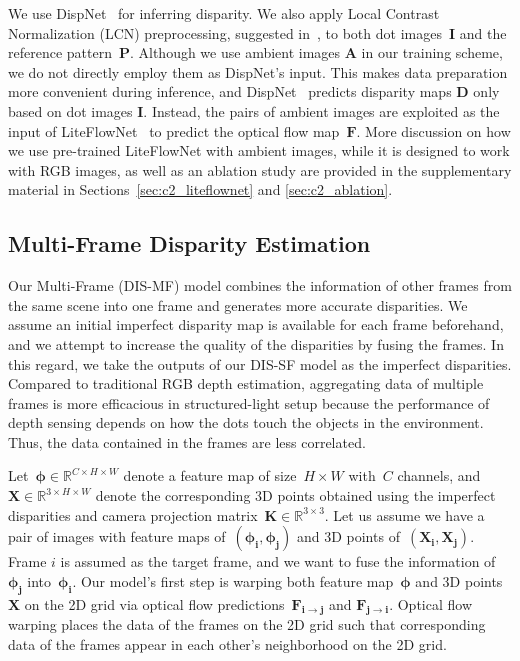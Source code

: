 We use DispNet~\citep{mayer2016large} for inferring disparity. We also apply Local Contrast Normalization (LCN) preprocessing, suggested in~\cite{zhang2018activestereonet, riegler2019connecting}, to both dot images~$\boldsymbol{I}$ and the reference pattern~$\boldsymbol{P}$. Although we use ambient images $\boldsymbol{A}$ in our training scheme, we do not directly employ them as DispNet's input. This makes data preparation more convenient during inference, and DispNet~\citep{mayer2016large} predicts disparity maps $\boldsymbol{D}$ only based on dot images $\boldsymbol{I}$. Instead, the pairs of ambient images are exploited as the input of LiteFlowNet~\citep{hui2018liteflownet} to predict the optical flow map~$\boldsymbol{F}$. More discussion on how we use pre-trained LiteFlowNet with ambient images, while it is designed to work with RGB images, as well as an ablation study are provided in the supplementary material in Sections~\ref{sec:c2_liteflownet} and \ref{sec:c2_ablation}.

\subsection{Multi-Frame Disparity Estimation} \label{sec:c2_muti-frame}

Our Multi-Frame (DIS-MF) model combines the information of other frames from the same scene into one frame and generates more accurate disparities. We assume an initial imperfect disparity map is available for each frame beforehand, and we attempt to increase the quality of the disparities by fusing the frames. In this regard, we take the outputs of our DIS-SF model as the imperfect disparities. Compared to traditional RGB depth estimation, aggregating data of multiple frames is more efficacious in structured-light setup because the performance of depth sensing depends on how the dots touch the objects in the environment. Thus, the data contained in the frames are less correlated.

Let~$\boldsymbol{\phi} \in \mathbb{R}^{C \times H \times W}$ denote a feature map of size~$H \times W$ with~$C$ channels, and~$\boldsymbol{X} \in \mathbb{R}^{3 \times H \times W}$ denote the corresponding 3D points obtained using the imperfect disparities and camera projection matrix~$\boldsymbol{K} \in \mathbb{R}^{3 \times 3}$. Let us assume we have a pair of images with feature maps of~$(\boldsymbol{\phi_i},\boldsymbol{\phi_j})$ and 3D points of~$(\boldsymbol{X_i},\boldsymbol{X_j})$. Frame $i$ is assumed as the target frame, and we want to fuse the information of~$\boldsymbol{\phi_j}$ into~$\boldsymbol{\phi_i}$. Our model's first step is warping both feature map~$\boldsymbol{\phi}$ and 3D points~$\boldsymbol{X}$ on the 2D grid via optical flow predictions~$\boldsymbol{F_{i \rightarrow j}}$ and $\boldsymbol{F_{j \rightarrow i}}$. Optical flow warping places the data of the frames on the 2D grid such that corresponding data of the frames appear in each other's neighborhood on the 2D grid.

